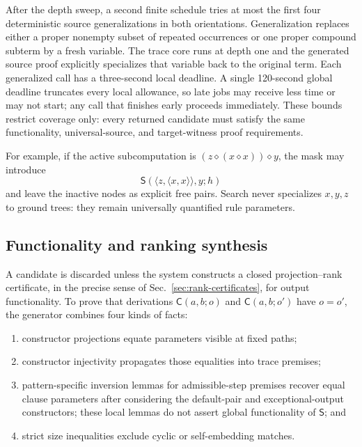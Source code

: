 \documentclass[runningheads]{llncs}
\newcommand{\op}{\mathbin{\diamond}}
\newcommand{\Code}{\mathsf{C}}
\newcommand{\Step}{\mathsf{S}}
\newcommand{\pair}[2]{\langle #1,#2\rangle}
\begin{document}
After the depth sweep, a second finite schedule tries at most the first four
deterministic source generalizations in both orientations.  Generalization
replaces either a proper nonempty subset of repeated occurrences or one proper
compound subterm by a fresh variable.  The trace core runs at depth one and the
generated source proof explicitly specializes that variable back to the
original term.  Each generalized call has a three-second local deadline.  A
single 120-second global deadline truncates every local allowance, so late
jobs may receive less time or may not start; any call that finishes early
proceeds immediately.  These bounds restrict coverage only: every returned
candidate must satisfy the same functionality, universal-source, and
target-witness proof requirements.

For example, if the active subcomputation is
$(z\op(x\op x))\op y$, the mask may introduce
\[
 \Step(\pair{z}{\pair{x}{x}},y;h)
\]
and leave the inactive nodes as explicit free pairs.  Search never
specializes $x,y,z$ to ground trees: they remain universally quantified rule
parameters.

\subsection{Functionality and ranking synthesis}

A candidate is discarded unless the system constructs a closed
projection--rank certificate, in the precise sense of
Sec.~\ref{sec:rank-certificates}, for output functionality.  To prove that
derivations $\Code(a,b;o)$ and $\Code(a,b;o')$ have $o=o'$, the generator
combines four kinds of facts:
\begin{enumerate}
  \item constructor projections equate parameters visible at fixed paths;
  \item constructor injectivity propagates those equalities into trace
    premises;
  \item pattern-specific inversion lemmas for admissible-step premises
    recover equal clause parameters after considering the default-pair and
    exceptional-output constructors; these local lemmas do not assert global
    functionality of $\Step$; and
  \item strict size inequalities exclude cyclic or self-embedding matches.
\end{enumerate}
\end{document}
